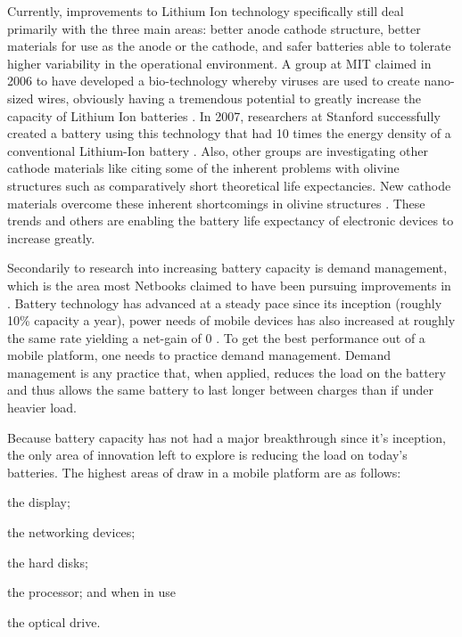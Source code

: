 Currently, improvements to Lithium Ion technology specifically still deal
primarily with the three main areas: better anode cathode structure, better
materials for use as the anode or the cathode, and safer batteries able to
tolerate higher variability in the operational environment.  A group at MIT
claimed in 2006 to have developed a bio-technology whereby viruses are used to
create nano-sized wires, obviously having a tremendous potential to greatly
increase the capacity of Lithium Ion batteries \citep{nam2006}.  In 2007,
researchers at Stanford successfully created a battery using this technology
that had 10 times the energy density of a conventional Lithium-Ion battery
\citep{stanford2007}.  Also, other groups are investigating other cathode
materials like  citing some of the inherent problems with olivine
structures such as comparatively short theoretical life expectancies.  New
cathode materials overcome these inherent shortcomings in olivine structures
\citep{ellis2007}.  These trends and others are enabling the battery life
expectancy of electronic devices to increase greatly.

Secondarily to research into increasing battery capacity is demand management,
which is the area most Netbooks claimed to have been pursuing improvements in
\citep{ap2009}.  Battery technology has advanced at a steady pace since its
inception (roughly 10\% capacity a year), power needs of mobile devices has also
increased at roughly the same rate yielding a net-gain of 0
\citep{buchmann2003}.  To get the best performance out of a mobile platform, one
needs to practice demand management.  Demand management is any practice that,
when applied, reduces the load on the battery and thus allows the same battery
to last longer between charges than if under heavier load.

Because battery capacity has not had a major breakthrough since it's inception,
the only area of innovation left to explore is reducing the load on today's
batteries.  The highest areas of draw in a mobile platform are as follows:
\begin{inparaenum}[(1)]
\item the display;
\item the networking devices;
\item the hard disks;
\item the processor; and when in use
\item the optical drive.
\end{inparaenum}


